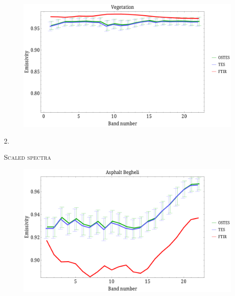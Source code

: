 \documentclass[xcolor=dvipsnames]{beamer}
\begin{document}
\begin{frame}[plain]{}
\begin{figure}[htb]
	\centering
	\includegraphics[scale=0.35]{Vegetation.pdf}
\end{figure}
\end{frame}

\begin{frame}[plain]{}
	\begin{center}
		\Huge\textsc{\Huge 2.}

		\textsc{\huge Scaled spectra}
	\end{center}
\end{frame}

\begin{frame}[plain]{}
\begin{figure}[htb]
	\centering
	\includegraphics[scale=0.35]{AsphaltBegheli_scaled.pdf}
\end{figure}
\end{frame}
\end{document}
